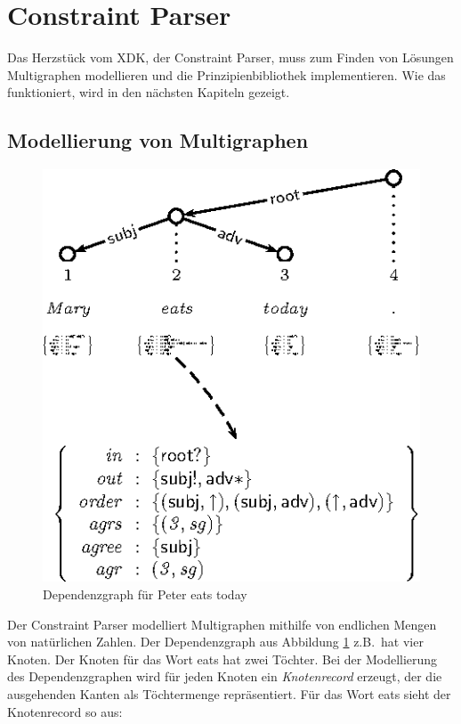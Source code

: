 \section{Constraint Parser}

Das Herzst\"uck vom XDK, der Constraint Parser, muss zum Finden von
L\"osungen Multigraphen modellieren und die Prinzipienbibliothek
implementieren. Wie das funktioniert, wird in den n\"achsten Kapiteln
gezeigt.

\subsection{Modellierung von Multigraphen}

\begin{figure}[!ht]
\begin{center}
\includegraphics[scale=1.0]{eps/syn1mag_xdag}
\end{center}
\caption{Dependenzgraph f\"ur Peter eats today}
\label{depbsp}
\end{figure}

Der Constraint Parser modelliert Multigraphen mithilfe von endlichen
Mengen von nat\"urlichen Zahlen. Der Dependenzgraph aus Abbildung
\ref{depbsp} z.B.\ hat vier Knoten. Der Knoten f\"ur das Wort eats hat
zwei T\"ochter. Bei der Modellierung des Dependenzgraphen wird f\"ur
jeden Knoten ein \emph{Knotenrecord} erzeugt, der die ausgehenden
Kanten als T\"ochtermenge repr\"asentiert. F\"ur das Wort eats sieht
der Knotenrecord so aus:

